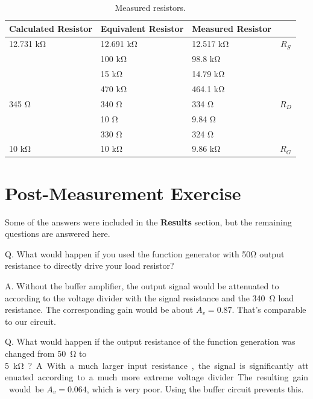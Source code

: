 \documentclass{../../ece-report}
\begin{document}
\begin{table}[h!]
  \centering
  \begin{tabular}{l l l c}\toprule
    \textbf{Calculated Resistor} & \textbf{Equivalent Resistor} & \textbf{Measured Resistor} & \\
    \midrule

12.731 \si{\kohm} & 12.691 \si{\kohm} & 12.517 \si{\kohm} & $R_S$ \\
          & 100 \si{\kohm}    & 98.8 \si{\kohm}   &       \\
          & 15 \si{\kohm}     & 14.79 \si{\kohm}  &       \\
          & 470 \si{\kohm}    & 464.1 \si{\kohm}  &       \\
          \midrule
345 \si{\ohm}    & 340 \si{\ohm}    & 334 \si{\ohm}    & $R_D$ \\
          & 10 \si{\ohm}     & 9.84 \si{\ohm}   &       \\
          & 330 \si{\ohm}    & 324   \si{\ohm}  &       \\
          \midrule
10 \si{\kohm}     & 10 \si{\kohm}     & 9.86 \si{\kohm}  & $R_G$ \\
\bottomrule
\end{tabular}
\caption{Measured resistors.}
\label{tab:resistors}
\end{table}

\section{Post-Measurement Exercise}

Some of the answers were included in the \textbf{Results} section, but
the remaining questions are answered here.

Q. What would happen if you used the function generator
with 50\si{\ohm} output resistance to directly drive
your load resistor?

A. Without the buffer amplifier, the output signal would
be attenuated to according to the voltage divider with
the signal resistance and the 340~\si{\ohm} load resistance.
The corresponding gain would be about $A_v = 0.87$.
That's comparable to our circuit.

Q. What would happen if the output resistance of the
function generation was changed from 50~\si{\ohm} to
5~\si\kohm?

A. With a much larger input resistance, the signal is
significantly attenuated according to a much more extreme
voltage divider. The resulting gain would be $A_v =
0.064$, which is very poor. Using the buffer circuit prevents this.
\end{document}
